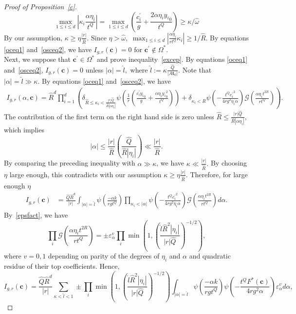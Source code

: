 \documentclass[11pt]{amsart}
\theoremstyle{plain}
\theoremstyle{plain}
\renewcommand{\vec}[1]{\mathbf{#1}}
\theoremstyle{remark}
\theoremstyle{definition}
\renewcommand{\hat}{\widehat}
\newcommand{\hQ}{\widehat{Q}}
\newcommand{\hR}{\widehat{R}}
\newcommand{\hl}{\widehat l}
\newcommand{\cG}{\mathcal{G}}
\begin{document}
\begin{proof}[Proof of Proposition~\ref{c}]
\[
\max_{1\leq i\leq d} \left|\kappa_i \frac{\alpha \eta_i }{t^{Q}} \right| =\max_{1\leq i\leq d}  \left(\frac{c_i^{\prime} }{g}+\frac{2\alpha \eta_i {y_i}_{0}}{t^Q} \right)\geq  \kappa/\hat{\omega}    
\]
 By our assumption,   $\kappa \geq \eta  \frac{|r|}{\hR}. $ Since $\eta>\hat{\omega},$  $ \max_{1\leq i\leq d} |\frac{\alpha \eta_i }{rt^{Q}} \kappa_i | \geq 1/\hR.$ By equations \eqref{oceq1} and~\eqref{osceq2}, we have    $I_{g,r}(\vec{c})=0$ for   $\vec{c}^{\prime}\notin\Omega^*.$
 \\
 
 Next, we suppose that $\vec{c}^{\prime}\in\Omega^*$ and prove inequality~\eqref{excep}. By equations \eqref{oceq1} and~\eqref{osceq2},    $I_{g,r}(\vec{c})=0$ unless 
 \(
 |\alpha|= \hl,
\)
where $\hl:= \kappa \frac{\hQ}{|A\vec{t}_0|}.$ Note that $  |\alpha|= \hl \gg \kappa.$  By equations \eqref{oceq1} and~\eqref{osceq2}, we have
\begin{equation}\label{oscformula}
\begin{split}
I_{g,r}(\alpha,\vec{c})=\hR^d\prod_{i=1}^d \left(
  \delta_{\hR \leq \kappa_i < \frac{|r|\hQ}{\hR|\alpha \eta_i|}} \psi \left( \frac{1}{r} \left( \frac{c_i^{\prime}{y_i}_0}{g} +\frac{\alpha  \eta_i {y_i}_0^2}{t^Q}   \right)\right)  +\delta_{\kappa_i<\hR}  \psi (-\frac{t^Q{c_i^{\prime}}^2}{4rg^2\eta_i \alpha})\cG\left(\frac{\alpha \eta_i t^{2R}}{rt^Q}\right)\right).
\end{split}
\end{equation}
The contribution of the first term on the right hand side is zero unless 
\(
\hR \leq \frac{|r|\hQ}{\hR|\alpha \eta_i|},
\) which implies 
\[
|\alpha|\leq  \frac{|r|}{\hR} \left(\frac{\hQ}{\hR|\eta_i|}  \right) \ll   \frac{|r|}{\hR}.
\]
By comparing the preceding inequality with $ \alpha \gg \kappa $, we have 
\(
\kappa\ll \frac{|r|}{\hR}.
\)  
By choosing $\eta$ large enough, this contradicts with our assumption $\kappa \geq \eta  \frac{|r|}{\hR}. $ Therefore, for large enough $\eta$
 \begin{equation*}
\begin{split}
I_{g,r}(\vec{c})&=\frac{\hQ\hR^{d}}{|r|} \int _{ |\alpha|=\hl  }  \psi(\frac{-\alpha k}{rgt^Q})  \prod_{\kappa_i<|\alpha|} \psi (-\frac{{t^Qc_i^{\prime}}^2}{4rg^2\eta_i \alpha}) 
\cG\left(\frac{\alpha \eta_i t^{2R}}{rt^Q}\right)
d\alpha.
\end{split}
\end{equation*}
By~\eqref{epsfact},  we have 
\[
 \prod_{i}\cG\left(\frac{\alpha \eta_i t^{2R}}{rt^Q}\right) 
  =\pm\varepsilon_{\alpha}^{v} \prod_{i}\min\left(1,\left(\frac{\hl \hR^2|\eta_i|}{|r|\hQ}\right)^{-1/2}\right), 
\]
where $v=0 ,1$ depending on parity of the degrees of $\eta_i$ and $\alpha$ and quadratic residue of their  top coefficients.   Hence,
\[
I_{g,r}(\vec{c})=\frac{\hQ\hR^{d}}{|r|}\sum_{\kappa<\hat{l}<1} \pm \prod_{i}\min\left(1,\left(\frac{\hl \hR^2|\eta_i|}{|r|\hQ}\right)^{-1/2}\right) \int _{ |\alpha| =\hat{l}  }  \psi(\frac{-\alpha k}{rgt^Q})   \psi (-\frac{t^QF^*(\vec{c})}{4rg^2 \alpha}) \varepsilon_{\alpha}^v d\alpha,
\]


\end{proof}
\end{document}
